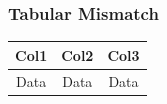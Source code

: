 \begin{frame}
\frametitle{Tabular Mismatch}
\begin{table}
\begin{tabular}{|c|c|c|}
\hline
Col1 & Col2 & Col3 \\
\hline
Data & Data & Data \\
\hline
\end{tabular}
\end{table}
\end{frame}
